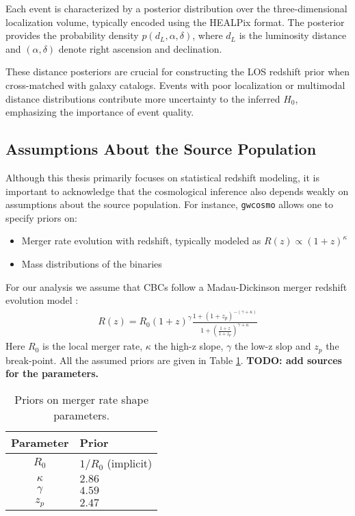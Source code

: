 Each event is characterized by a posterior distribution over the three-dimensional localization volume, typically encoded using the HEALPix format. The posterior provides the probability density $p(d_L, \alpha, \delta)$, where $d_L$ is the luminosity distance and $(\alpha, \delta)$ denote right ascension and declination.

These distance posteriors are crucial for constructing the \ac{LOS} redshift prior when cross-matched with galaxy catalogs. Events with poor localization or multimodal distance distributions contribute more uncertainty to the inferred $H_0$, emphasizing the importance of event quality.

\subsection{Assumptions About the Source Population}
\label{sec:source_population}

Although this thesis primarily focuses on statistical redshift modeling, it is important to acknowledge that the cosmological inference also depends weakly on assumptions about the source population. For instance, \texttt{gwcosmo} allows one to specify priors on:
\vspace{-2em}
\begin{itemize}
  \item Merger rate evolution with redshift, typically modeled as \( R(z) \propto (1+z)^\kappa \)
  \vspace{-1em}
  \item Mass distributions of the binaries
\end{itemize}

For our analysis we assume that \acp{CBC} follow a Madau-Dickinson merger redshift evolution model \citep{madau2014cosmic}:
\begin{align}
    R(z) = R_0(1+z)^{\gamma}\frac{1+(1+z_p)^{-(\gamma+\kappa)}}{1+\left( \frac{1+z}{1+z_p}\right)^{\gamma + \kappa}}
\end{align}
Here $R_0$ is the local merger rate, $\kappa$ the high-z slope, $\gamma$ the low-z slop and $z_p$ the break-point. All the assumed priors are given in Table \ref{tab:Madau}. \textbf{TODO: add sources for the parameters.}

\begin{table}[h!]
    \centering
    \caption{Priors on merger rate shape parameters.}
    \label{tab:Madau}
    \begin{tabular}{c l}
        \hline
        \textbf{Parameter} & \textbf{Prior} \\
        \hline
         $R_0$ & $1/R_0$ (implicit) \\
         $\kappa$ & $2.86$ \\
         $\gamma$ & $4.59$ \\
         $z_p$ & $2.47$ \\
         \hline
    \end{tabular}
\end{table}

